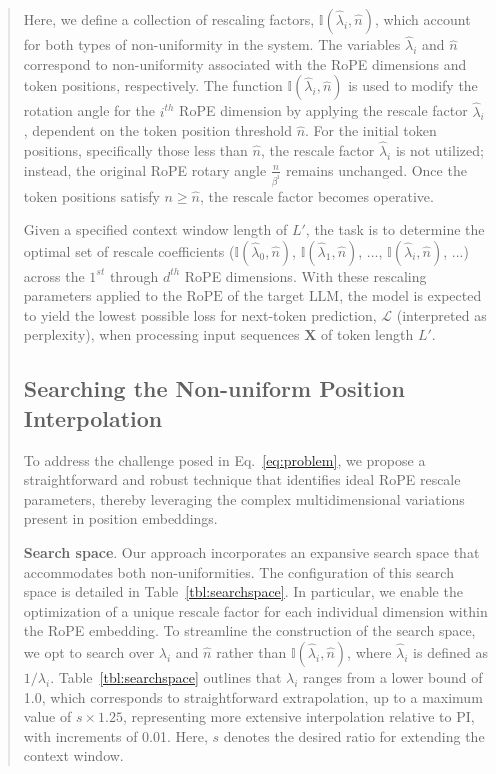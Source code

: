 \begin{abstract}
Here, we define a collection of rescaling factors, $\mathbb{I}(\hat{\lambda}_{i},\hat{n})$, which account for both types of non-uniformity in the system. The variables $\hat{\lambda}_i$ and $\hat{n}$ correspond to non-uniformity associated with the RoPE dimensions and token positions, respectively. The function $\mathbb{I}(\hat{\lambda}_{i},\hat{n})$ is used to modify the rotation angle for the $i^{th}$ RoPE dimension by applying the rescale factor $\hat{\lambda}_i$, dependent on the token position threshold $\hat{n}$. For the initial token positions, specifically those less than $\hat{n}$, the rescale factor $\hat{\lambda}_i$ is not utilized; instead, the original RoPE rotary angle $\frac{n}{\beta^i}$ remains unchanged. Once the token positions satisfy $n\ge\hat{n}$, the rescale factor becomes operative.

Given a specified context window length of $L'$, the task is to determine the optimal set of rescale coefficients ($\mathbb{I}(\hat{\lambda}_{0},\hat{n})$, $\mathbb{I}(\hat{\lambda}_{1},\hat{n})$, ..., $\mathbb{I}(\hat{\lambda}_{i},\hat{n})$, ...) across the $1^{st}$ through $d^{th}$ RoPE dimensions. With these rescaling parameters applied to the $\text{RoPE}$ of the target $\text{LLM}$, the model is expected to yield the lowest possible loss for next-token prediction, $\mathcal{L}$ (interpreted as perplexity), when processing input sequences $\mathbf{X}$ of token length $L'$.

\subsection{Searching the Non-uniform Position Interpolation}

To address the challenge posed in Eq.~\ref{eq:problem}, we propose a straightforward and robust technique that identifies ideal RoPE rescale parameters, thereby leveraging the complex multidimensional variations present in position embeddings.

\textbf{Search space}. Our approach incorporates an expansive search space that accommodates both non-uniformities. The configuration of this search space is detailed in Table~\ref{tbl:searchspace}. In particular, we enable the optimization of a unique rescale factor for each individual dimension within the RoPE embedding. To streamline the construction of the search space, we opt to search over $\lambda_i$ and $\hat{n}$ rather than $\mathbb{I}(\hat{\lambda}_{i},\hat{n})$, where $\hat{\lambda}_{i}$ is defined as $1/\lambda_i$. 
Table~\ref{tbl:searchspace} outlines that $\lambda_i$ ranges from a lower bound of 1.0, which corresponds to straightforward extrapolation, up to a maximum value of $s\times1.25$, representing more extensive interpolation relative to PI, with increments of 0.01. Here, $s$ denotes the desired ratio for extending the context window.


\end{abstract}
